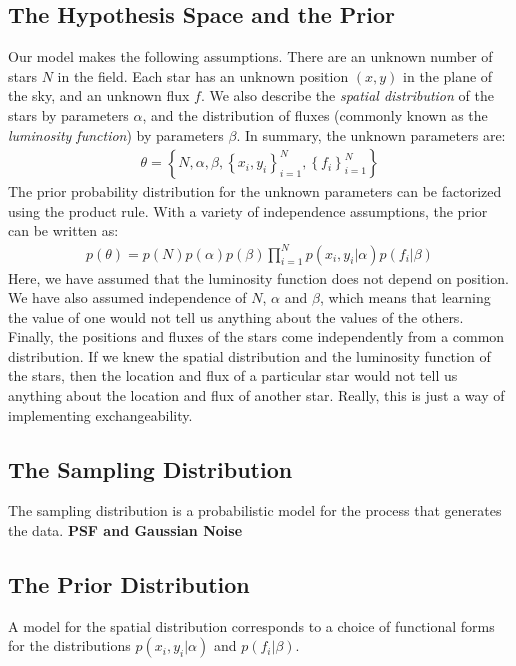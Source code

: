 \documentclass[letterpaper, 11pt]{article}
\begin{document}
\subsection{The Hypothesis Space and the Prior}
Our model makes the following assumptions. There are an unknown number of stars
$N$ in the field. Each star has an unknown
position $(x,y)$ in the plane of the sky, and an unknown flux $f$. We also
describe the {\it spatial distribution} of the stars by parameters
$\alpha$, and the distribution of fluxes (commonly known as the {\it luminosity
function}) by parameters $\beta$. In summary, the unknown parameters are:
\begin{eqnarray}
\theta = \left\{N, \alpha, \beta, \left\{x_i, y_i\right\}_{i=1}^N, 
\left\{f_i\right\}_{i=1}^N\right\}
\end{eqnarray}
The prior probability distribution for the unknown parameters can be factorized
using the product rule. With a variety of independence assumptions, the prior
can be written as:
\begin{eqnarray}
p(\theta) = p(N)p(\alpha)p(\beta)\prod_{i=1}^N p(x_i, y_i | \alpha)
p(f_i | \beta) 
\end{eqnarray}
Here, we have assumed that the luminosity function does not depend on position.
We have also assumed independence of $N$, $\alpha$ and $\beta$, which means that
learning the value of one would not tell us anything about the values of the
others. Finally, the positions and fluxes of the stars come independently from
a common distribution. If we knew the spatial distribution and the luminosity
function of the stars, then the location and flux of a particular star would
not tell us anything about the location and flux of another star. Really, this
is just a way of implementing exchangeability.

\subsection{The Sampling Distribution}
The sampling distribution is a probabilistic model for the process that
generates the data. {\bf PSF and Gaussian Noise}

\subsection{The Prior Distribution}
A model for the spatial distribution corresponds to a choice of functional
forms for the distributions $p(x_i, y_i | \alpha)$ and $p(f_i | \beta)$.
\end{document}
